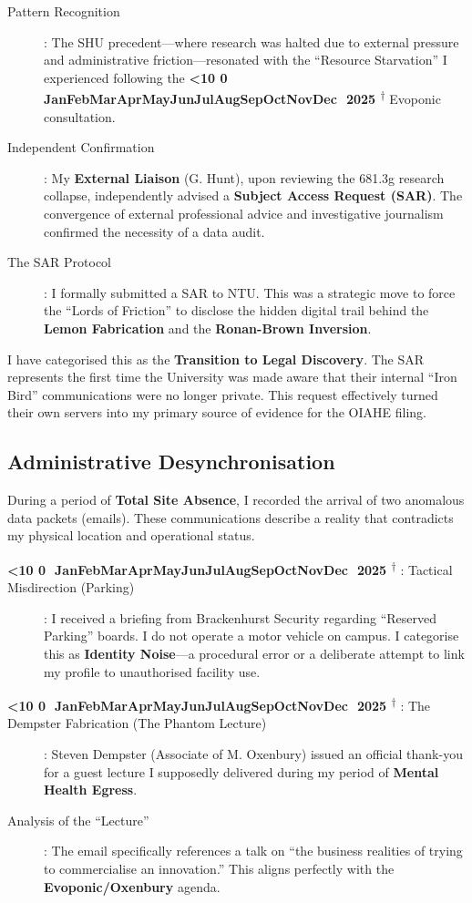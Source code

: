 \documentclass{EMBASSY}
\DeclareRobustCommand{\gmt}[3]{%
    \texorpdfstring{%
        {\color{DateGold}\textbf{%
            \ifnum#1<10 0\fi#1\,\textperiodcentered\,%
            \ifcase#2\or Jan\or Feb\or Mar\or Apr\or May\or Jun\or Jul\or Aug\or Sep\or Oct\or Nov\or Dec\fi
            \,\textperiodcentered\,20#3%
            \textsuperscript{$\dagger$}%
        }}%
    }{%
        (#1/#2/#3)%
    }%
}
\begin{document}
\begin{description}
	\item[Pattern Recognition]: The SHU precedent---where research was halted due to external pressure and administrative friction---resonated with the ``Resource Starvation'' I experienced following the \gmt{23}{10}{25} Evoponic consultation.
	\item[Independent Confirmation]: My \textbf{External Liaison} (G. Hunt), upon reviewing the 681.3g research collapse, independently advised a \textbf{Subject Access Request (SAR)}. The convergence of external professional advice and investigative journalism confirmed the necessity of a data audit.
	\item[The SAR Protocol]: I formally submitted a SAR to NTU. This was a strategic move to force the ``Lords of Friction'' to disclose the hidden digital trail behind the \textbf{Lemon Fabrication} and the \textbf{Ronan-Brown Inversion}.
\end{description}

\noindent I have categorised this as the \textbf{Transition to Legal Discovery}. The SAR represents the first time the University was made aware that their internal ``Iron Bird'' communications were no longer private. This request effectively turned their own servers into my primary source of evidence for the OIAHE filing.

\subsection{Administrative Desynchronisation}
During a period of \textbf{Total Site Absence}, I recorded the arrival of two anomalous data packets (emails). These communications describe a reality that contradicts my physical location and operational status.

\begin{description}
	\item[\gmt{14}{11}{25}: Tactical Misdirection (Parking)]: I received a briefing from Brackenhurst Security regarding ``Reserved Parking'' boards. I do not operate a motor vehicle on campus. I categorise this as \textbf{Identity Noise}---a procedural error or a deliberate attempt to link my profile to unauthorised facility use.
	\item[\gmt{18}{11}{25}: The Dempster Fabrication (The Phantom Lecture)]: Steven Dempster (Associate of M. Oxenbury) issued an official thank-you for a guest lecture I supposedly delivered during my period of \textbf{Mental Health Egress}.
	\item[Analysis of the ``Lecture'']: The email specifically references a talk on ``the business realities of trying to commercialise an innovation.'' This aligns perfectly with the \textbf{Evoponic/Oxenbury} agenda.
\end{description}
\end{document}
